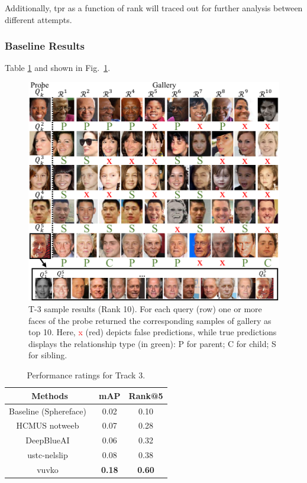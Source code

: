 \documentclass[letterpaper, 10 pt, conference]{ieeeconf}
\begin{document}
Additionally, \ac{tpr} as a function of rank will traced out for further analysis between different attempts.




\subsubsection{Baseline Results}
Table \ref{tbl:t3:benchmarks} and shown in Fig.~\ref{fig:track3:montage}.






\begin{figure}[t!]
    \centering
    \includegraphics[width = .85\linewidth]{figures/track3-samples-crop.pdf}
    \caption{T-3 sample results (Rank 10). For each query (row) one or more faces of the probe returned the corresponding samples of gallery as top 10. Here, \textcolor{red}{x} (red) depicts false predictions, while true predictions displays the relationship type (in green): \textcolor{ao(english)}{P} for parent; \textcolor{ao(english)}{C} for child; \textcolor{ao(english)}{S} for sibling.}
    \label{fig:track3:montage}
    \vspace{-5mm}
\end{figure}
\begin{table}[b!]
	\centering
	\caption{Performance ratings for Track 3.}
	\begin{tabular}{c|cc} 
	      \textbf{Methods}  &\textbf{mAP} & \textbf{Rank@5} \\ \hline
		  Baseline (Sphereface)~\cite{Liu_2017_CVPR} & 0.02 & 0.10	\\
		  HCMUS notweeb~\cite{id9} & 0.07 & 0.28	\\
		  DeepBlueAI~\cite{id3} & 0.06 & 0.32	\\
		  ustc-nelslip~\cite{id8} & 0.08 & 0.38	\\
		  vuvko~\cite{id4} & \textbf{0.18} & \textbf{0.60}	\\
	\end{tabular}
	\label{tbl:t3:benchmarks}
\end{table}
\end{document}
